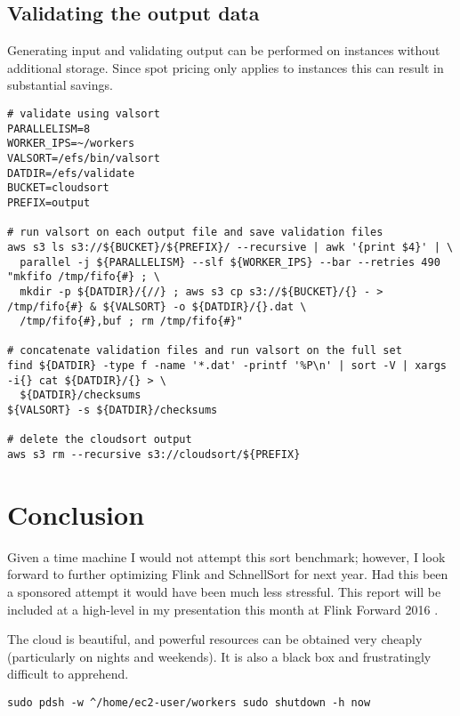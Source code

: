\documentclass{article}
\begin{document}
\subsection{Validating the output data}

Generating input and validating output can be performed on instances without additional storage. Since spot pricing only applies to instances this can result in substantial savings.

\begin{adjustwidth}{-1.5in}{-1.5in}
\begin{verbatim}
# validate using valsort
PARALLELISM=8
WORKER_IPS=~/workers
VALSORT=/efs/bin/valsort
DATDIR=/efs/validate
BUCKET=cloudsort
PREFIX=output

# run valsort on each output file and save validation files
aws s3 ls s3://${BUCKET}/${PREFIX}/ --recursive | awk '{print $4}' | \
  parallel -j ${PARALLELISM} --slf ${WORKER_IPS} --bar --retries 490 "mkfifo /tmp/fifo{#} ; \
  mkdir -p ${DATDIR}/{//} ; aws s3 cp s3://${BUCKET}/{} - > /tmp/fifo{#} & ${VALSORT} -o ${DATDIR}/{}.dat \
  /tmp/fifo{#},buf ; rm /tmp/fifo{#}"

# concatenate validation files and run valsort on the full set
find ${DATDIR} -type f -name '*.dat' -printf '%P\n' | sort -V | xargs -i{} cat ${DATDIR}/{} > \
  ${DATDIR}/checksums
${VALSORT} -s ${DATDIR}/checksums

# delete the cloudsort output
aws s3 rm --recursive s3://cloudsort/${PREFIX}
\end{verbatim}
\end{adjustwidth}

\section{Conclusion}

Given a time machine I would not attempt this sort benchmark; however, I look forward to further optimizing Flink and SchnellSort for next year. Had this been a sponsored attempt it would have been much less stressful. This report will be included at a high-level in my presentation this month at Flink Forward 2016 \cite{flink-forward}.

The cloud is beautiful, and powerful resources can be obtained very cheaply (particularly on nights and weekends). It is also a black box and frustratingly difficult to apprehend.

\begin{verbatim}
sudo pdsh -w ^/home/ec2-user/workers sudo shutdown -h now
\end{verbatim}

\printbibliography
\end{document}
